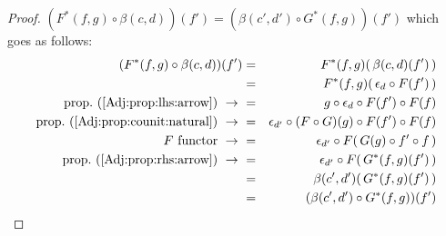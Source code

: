 \begin{proof}
    $(F^{*}(f,g)\circ\beta(c,d))(f')=(\beta(c',d')\circ G^{*}(f,g))(f')$
    which goes as follows:
        \begin{eqnarray*}(F^{*}(f,g)\circ\beta(c,d))(f')
            &=&F^{*}(f,g)(\,\beta(c,d)(f')\,)\\
            &=&F^{*}(f,g)(\,\epsilon_{d}\circ F(f')\,)\\
            \mbox{prop.~(\ref{Adj:prop:lhs:arrow})}\ \to\ 
            &=&g\circ \epsilon_{d}\circ F(f')\circ F(f)\\
            \mbox{prop.~(\ref{Adj:prop:counit:natural})}\ \to\ 
            &=&\epsilon_{d'}\circ (F\circ G)(g)\circ F(f')\circ F(f)\\
            \mbox{$F$ functor}\ \to\ 
            &=&\epsilon_{d'}\circ F(\,G(g)\circ f'\circ f\,)\\
            \mbox{prop.~(\ref{Adj:prop:rhs:arrow})}\ \to\ 
            &=&\epsilon_{d'}\circ F(\,G^{*}(f,g)(f')\,)\\
            &=&\beta(c',d')(\,G^{*}(f,g)(f')\,)\\
            &=&(\beta(c',d')\circ G^{*}(f,g))(f')\\
        \end{eqnarray*}
\end{proof}
